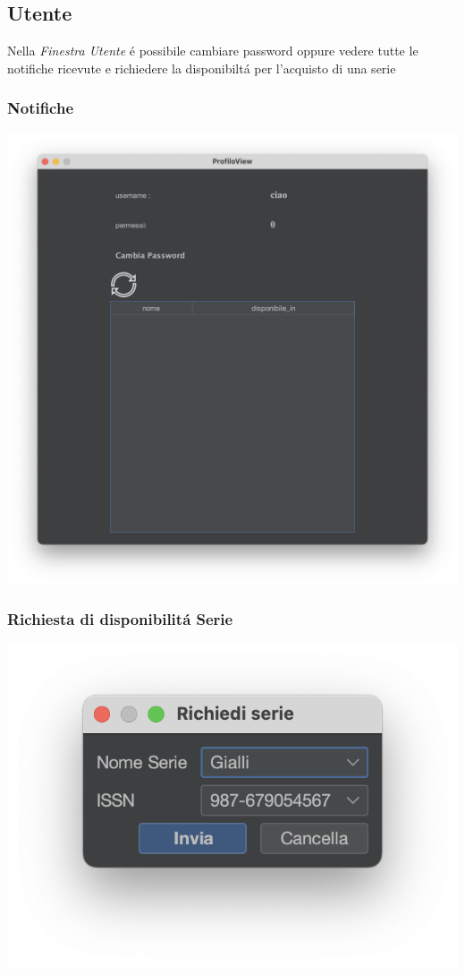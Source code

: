  \subsection{Utente}
 Nella \textit{Finestra Utente} \'e possibile cambiare password oppure vedere tutte le notifiche ricevute e richiedere la disponibilt\'a per l'acquisto di una serie
 \subsubsection{Notifiche}
 \includegraphics[scale=0.25, center]{Immagini/Schermate/Utente/NotificheUtente.png}
 \subsubsection{Richiesta di disponibilit\'a Serie}
 \includegraphics[scale=0.50, center]{Immagini/Schermate/Utente/RichiediDisponibilita.png}